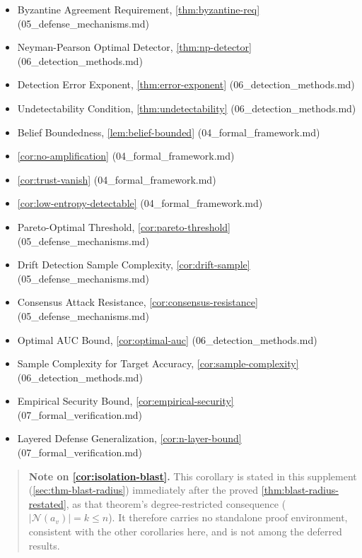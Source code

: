 \documentclass[
]{article}
\begin{document}
\begin{itemize}
  (04\_formal\_framework.md; the model-checking restatement
  \cref{thm:trust-bound} is proved here, the section-4 statement is not)
\item
  Byzantine Agreement Requirement, \cref{thm:byzantine-req}
  (05\_defense\_mechanisms.md)
\item
  Neyman-Pearson Optimal Detector, \cref{thm:np-detector}
  (06\_detection\_methods.md)
\item
  Detection Error Exponent, \cref{thm:error-exponent}
  (06\_detection\_methods.md)
\item
  Undetectability Condition, \cref{thm:undetectability}
  (06\_detection\_methods.md)
\item
  Belief Boundedness, \cref{lem:belief-bounded}
  (04\_formal\_framework.md)
\item
  \cref{cor:no-amplification} (04\_formal\_framework.md)
\item
  \cref{cor:trust-vanish} (04\_formal\_framework.md)
\item
  \cref{cor:low-entropy-detectable} (04\_formal\_framework.md)
\item
  Pareto-Optimal Threshold, \cref{cor:pareto-threshold}
  (05\_defense\_mechanisms.md)
\item
  Drift Detection Sample Complexity, \cref{cor:drift-sample}
  (05\_defense\_mechanisms.md)
\item
  Consensus Attack Resistance, \cref{cor:consensus-resistance}
  (05\_defense\_mechanisms.md)
\item
  Optimal AUC Bound, \cref{cor:optimal-auc} (06\_detection\_methods.md)
\item
  Sample Complexity for Target Accuracy, \cref{cor:sample-complexity}
  (06\_detection\_methods.md)
\item
  Empirical Security Bound, \cref{cor:empirical-security}
  (07\_formal\_verification.md)
\item
  Layered Defense Generalization, \cref{cor:n-layer-bound}
  (07\_formal\_verification.md)
\end{itemize}

\begin{quote}
\textbf{Note on \cref{cor:isolation-blast}.} This corollary is stated in
this supplement (\cref{sec:thm-blast-radius}) immediately after the
proved \cref{thm:blast-radius-restated}, as that theorem's
degree-restricted consequence
(\(\lvert \mathcal{N}(a_v) \rvert = k \le n\)). It therefore carries no
standalone proof environment, consistent with the other corollaries
here, and is not among the deferred results.
\end{quote}
\end{document}
